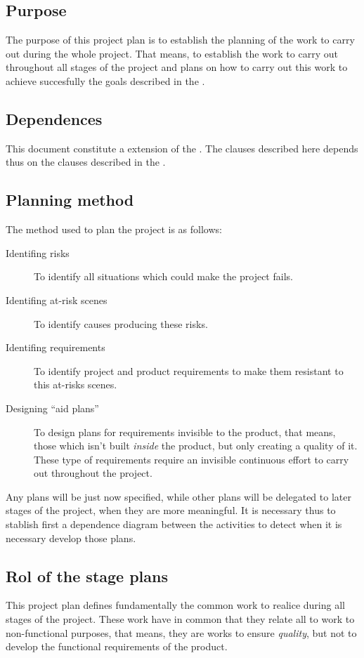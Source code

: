 \documentclass[twocolumn, 9pt]{extarticle}
\begin{document}
\subsection{Purpose}
The purpose of this project plan is to establish the planning of the
work to carry out during the whole project. That means, to establish
the work to carry out throughout all stages of the project and plans
on how to carry out this work to achieve succesfully the goals
described in the \favp.

\subsection{Dependences}
This document constitute a extension of the \favc. The clauses
described here depends thus on the clauses described in the \favc.

\subsection{Planning method}
\label{ssec:planning-method}
The method used to plan the project is as follows:

\begin{description}
\item[Identifing risks] To identify all situations which could make the
  project fails.
\item[Identifing at-risk scenes] To identify causes producing these risks.
\item[Identifing requirements] To identify project and product
  requirements to make them resistant to this at-risks scenes.
\item[Designing ``aid plans''] To design plans for
  requirements invisible to the product, that means, those which isn't
  built \textit{inside} the product, but only creating a quality of
  it. These type of requirements require an invisible continuous
  effort to carry out throughout the project.
\end{description}

Any plans will be just now specified, while other plans will be
delegated to later stages of the project, when they are more
meaningful. It is necessary thus to stablish first a dependence
diagram between the activities to detect when it is necessary
develop those plans.

\subsection{Rol of the stage plans}
This project plan defines fundamentally the common work to realice
during all stages of the project. These work have in common that they
relate all to work to non-functional purposes, that means, they are
works to ensure \textit{quality}, but not to develop the functional
requirements of the product.
\end{document}
